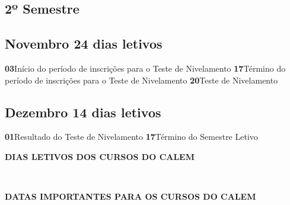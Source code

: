 \documentclass[thesis]{hmcposter}
\begin{document}
\begin{poster}
\section{\hfill \color{hmcorange}2º Semestre}
							\subsection{Novembro \hfill 24 dias letivos}\textbf{03}\qquad Início do período de inscrições para o Teste de Nivelamento \newline \null\textbf{17}\qquad Término do período de inscrições para o Teste de Nivelamento \newline \null\textbf{20}\qquad Teste de Nivelamento \newline \null\subsection{Dezembro \hfill 14 dias letivos}\textbf{01}\qquad Resultado do Teste de Nivelamento \newline \null\textbf{17}\qquad Término do Semestre Letivo \newline \null\newpage
~
\vfill
\begin{center}
\large \textbf{DIAS LETIVOS DOS CURSOS DO CALEM}
\newline
\null
\newline
\begin{table}
\centering
{}
\end{table}
\newline
\null
\newline
\end{center}
\vfill
\null
\columnbreak
~
\vfill
\begin{center}
\large \textbf{DATAS IMPORTANTES PARA OS CURSOS DO CALEM}
\newline
\null
\newline
\begin{table}

\end{table}
\end{center}
\end{poster}
\end{document}
